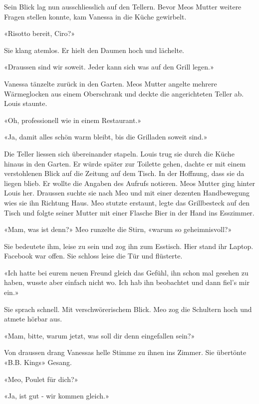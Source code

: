 Sein Blick lag nun ausschliesslich auf den Tellern.
Bevor Meos Mutter weitere Fragen stellen konnte, kam Vanessa in die
Küche gewirbelt.

«Risotto bereit, Ciro?»

Sie klang atemlos.
Er hielt den Daumen hoch und lächelte.

«Draussen sind wir soweit. Jeder kann sich was auf den Grill legen.»

Vanessa tänzelte zurück in den Garten. Meos Mutter angelte mehrere Wärmeglocken aus einem Oberschrank und deckte die angerichteten Teller ab. Louis staunte. 

«Oh, professionell wie in einem Restaurant.»

«Ja, damit alles schön warm bleibt, bis die Grilladen soweit sind.»

Die Teller liessen sich übereinander stapeln. Louis trug sie
durch die Küche hinaus in den Garten. Er würde später zur Toilette gehen, dachte er mit einem
verstohlenen Blick auf die Zeitung auf dem Tisch. In der Hoffnung, dass
sie da liegen blieb. Er wollte die Angaben des Aufrufs notieren.
Meos Mutter ging hinter Louis her. Draussen suchte sie nach Meo und mit
einer dezenten Handbewegung wies sie ihn Richtung Haus. Meo stutzte erstaunt,
legte das Grillbesteck auf den Tisch und folgte seiner Mutter mit einer
Flasche Bier in der Hand ins Esszimmer.

«Mam, was ist denn?» Meo runzelte die Stirn, «warum so geheimnisvoll?»

Sie bedeutete ihm, leise zu sein und zog ihn zum Esstisch. Hier stand
ihr Laptop. Facebook war offen.
Sie schloss leise die Tür und flüsterte.

«Ich hatte bei eurem neuen Freund gleich das Gefühl, ihn schon mal
gesehen zu haben, wusste aber einfach nicht wo. Ich hab ihn beobachtet
und dann fiel’s mir ein.»

Sie sprach schnell. Mit verschwörerischem Blick. Meo zog die Schultern
hoch und atmete hörbar aus.

«Mam, bitte, warum jetzt, was soll dir denn eingefallen sein?»

Von draussen drang Vanessas helle Stimme zu ihnen ins Zimmer. Sie
übertönte «B.B. Kings» Gesang.


«Meo, Poulet für dich?»

«Ja, ist gut - wir kommen gleich.»

